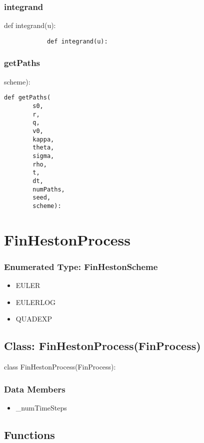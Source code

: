 \documentclass[twoside,11pt]{book}
\begin{document}
\subsubsection*{{\bf integrand}}
def integrand(u): 

\begin{lstlisting}
            def integrand(u):
\end{lstlisting}

\subsubsection*{{\bf getPaths}}
scheme): 

\begin{lstlisting}
def getPaths(
        s0,
        r,
        q,
        v0,
        kappa,
        theta,
        sigma,
        rho,
        t,
        dt,
        numPaths,
        seed,
        scheme):
\end{lstlisting}

\newpage
\section{FinHestonProcess}

\subsubsection{Enumerated Type: FinHestonScheme}
\begin{itemize}
\item{EULER}
\item{EULERLOG}
\item{QUADEXP}
\end{itemize}

\subsection*{Class: FinHestonProcess(FinProcess)}
class FinHestonProcess(FinProcess): 

\subsubsection*{Data Members}
\begin{itemize}
\item{\_numTimeSteps}
\end{itemize}

\subsection*{Functions}
\end{document}
